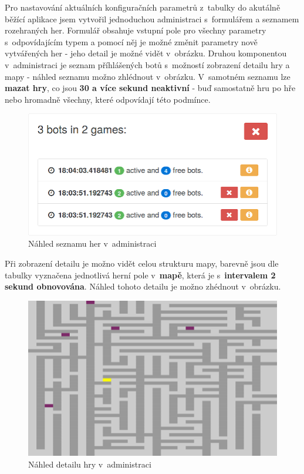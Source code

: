 Pro nastavování aktuálních konfiguračních parametrů z~tabulky do akutálně běžící aplikace jsem vytvořil jednoduchou administraci s~formulářem a seznamem rozehraných her. Formulář obsahuje vstupní pole pro všechny parametry s~odpovídajícím typem a pomocí něj je možné změnit parametry nově vytvářených her - jeho detail je možné vidět v~obrázku. Druhou komponentou v~administraci je seznam příhlášených botů s~možností zobrazení detailu hry a mapy - náhled seznamu možno zhlédnout v~obrázku. V~samotném seznamu lze \textbf{mazat hry}, co jsou \textbf{30 a více sekund neaktivní} - buď samostatně hru po hře nebo hromadně všechny, které odpovídají této podmínce.

\begin{figure}[h]
	\centering
	\includegraphics{assets/admin-games-list}
	\caption{Náhled seznamu her v~administraci}
	\label{fig:admin-games-list}
\end{figure}

Při zobrazení detailu je možno vidět celou strukturu mapy, barevně jsou dle tabulky vyznačena jednotlivá herní pole v~\textbf{mapě}, která je s~\textbf{intervalem 2 sekund obnovována}. Náhled tohoto detailu je možno zhédnout v~obrázku.

\begin{figure}[h]
	\centering
	\includegraphics{assets/admin-game-detail}
	\caption{Náhled detailu hry v~administraci}
	\label{fig:admin-game-detail}
\end{figure}

